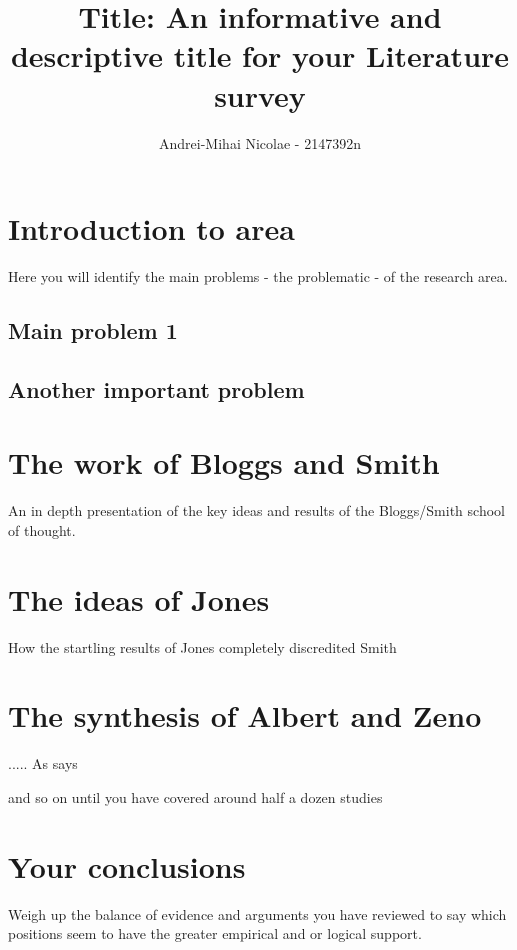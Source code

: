 \documentclass[a4paper,portrait,12pt]{article}
\author{Andrei-Mihai Nicolae - 2147392n}
\title{Title:  An informative and descriptive title for your Literature survey }
\begin{document}
\setlength{\oddsidemargin}{0.9847in-1in}
\setlength{\textwidth}{\paperwidth - 0.9847in-0.9847in}
  
\maketitle

 \section{Introduction to area}
 Here you will identify the main problems - the problematic - of the research area.
   \subsection{Main problem 1}
   \subsection{Another important problem}
 \section{The work of Bloggs and Smith}
 
  An in depth presentation of the key ideas and results of the Bloggs/Smith
  school of thought\citep{SYMBOL}. 
 \section{The ideas of Jones}
 
 How the startling results of Jones\citep{Hayes89} completely discredited Smith
 
 \section{The synthesis of  Albert and Zeno}
 ..... As \citet{Einstein} says
 
 and so on until you have covered around half a dozen studies
 \section{Your conclusions}

Weigh up the balance of evidence and arguments you have reviewed to say which
positions seem to have the greater empirical and or logical support.



\end{document}

